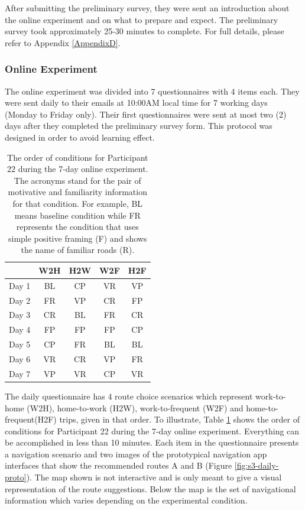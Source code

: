 After submitting the preliminary survey, they were sent an introduction about the online experiment and on what to prepare and expect. The preliminary survey took approximately 25-30 minutes to complete. For full details, please refer to Appendix \ref{AppendixD}.

\subsubsection{Online Experiment}
The online experiment was divided into 7 questionnaires with 4 items each. They were sent daily to their emails at 10:00AM local time for 7 working days (Monday to Friday only). Their first questionnaires were sent at most two (2) days after they completed the preliminary survey form. This protocol was designed in order to avoid learning effect.

\begin{table}[h]
    \caption{The order of conditions for Participant 22 during the 7-day online experiment. The acronyms stand for the pair of motivative and familiarity information for that condition. For example, BL means baseline condition while FR represents the condition that uses simple positive framing (F) and shows the name of familiar roads (R).}
	\label{tab:sample-order}
	\centering
	\begin{tabular}{l c c c c}
	    \hline\hline
		& \textbf{W2H} & \textbf{H2W} & \textbf{W2F} & \textbf{H2F} \\
		\hline
		Day 1 & BL & CP & VR & VP \\
        Day 2 & FR & VP & CR & FP \\
        Day 3 & CR & BL & FR & CR \\
        Day 4 & FP & FP & FP & CP \\
        Day 5 & CP & FR & BL & BL \\
        Day 6 & VR & CR & VP & FR \\
        Day 7 & VP & VR & CP & VR \\
		\hline
	\end{tabular}
\end{table}

The daily questionnaire has 4 route choice scenarios which represent work-to-home (W2H), home-to-work (H2W), work-to-frequent (W2F) and home-to-frequent(H2F) trips, given in that order. To illustrate, Table \ref{tab:sample-order} shows the order of conditions for Participant 22 during the 7-day online experiment. Everything can be accomplished in less than 10 minutes. Each item in the questionnaire presents a navigation scenario and two images of the prototypical navigation app interfaces that show the recommended routes A and B (Figure \ref{fig:s3-daily-proto}). The map shown is not interactive and is only meant to give a visual representation of the route suggestions. Below the map is the set of navigational information which varies depending on the experimental condition.

